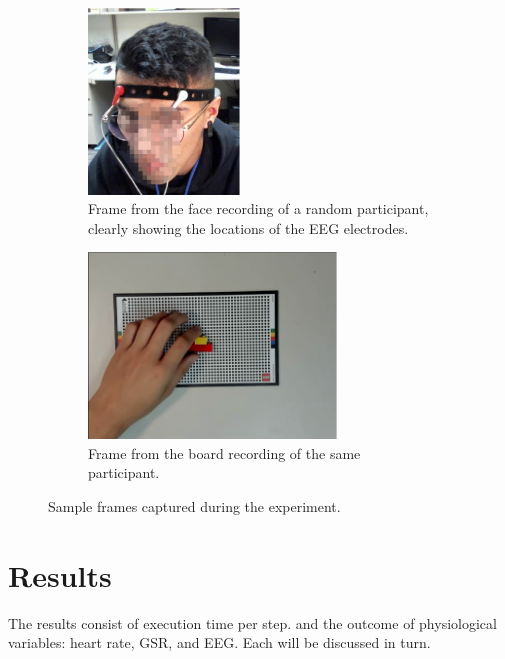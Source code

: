 \begin{figure}[h]
  \centering
  \begin{subfigure}[t]{.35\textwidth}
    \centering
    \includegraphics[height=140pt]{publications/2021ImpactDelayedResponse/Fig5a.eps}
    \caption{Frame from the face recording of a random participant, clearly showing the locations of the EEG electrodes.}
  \end{subfigure}%
  \hfill%
  \begin{subfigure}[t]{.60\textwidth}
    \centering
    \includegraphics[height=140pt]{publications/2021ImpactDelayedResponse/Fig5b.eps}
    \caption{Frame from the board recording of the same participant.}
  \end{subfigure}
  \caption{Sample frames captured during the experiment.}\label{fig:sampleframes}
\end{figure}

\section{Results}\label{sec:results}

The results consist of execution time per step. and the outcome of physiological variables: heart rate, GSR, and EEG.\@
Each will be discussed in turn.


